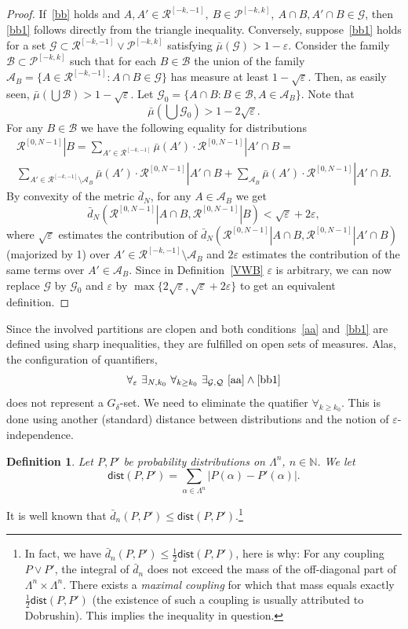 \documentclass{amsart}
\newtheorem{defn}[thm]{Definition}
\theoremstyle{remark}
\def \N {\mathbb N}
\def \R {\mathcal R}
\def \A {\mathcal A}
\def \B {\mathcal B}
\def \G {\mathcal G}
\def \P {\mathcal P}
\def \eps {\varepsilon}
\def \dist{\mathsf{dist}}
\begin{document}
\begin{proof}
If~\eqref{bb} holds and $A,A'\in\R^{[-k,-1]},\ B\in\P^{[-k,k]},\ A\cap B,A'\cap B\in\G$, then \eqref{bb1} follows directly from the triangle inequality. Conversely, suppose~\eqref{bb1} holds for a set
$\G\subset\R^{[-k,-1]}\vee\P^{[-k,k]}$ satisfying $\bar\mu(\G)>1-\eps$. Consider the family $\B\subset\P^{[-k,k]}$ such that for each $B\in\B$ the union of the family $\A_B=\{A\in\R^{[-k,-1]}:A\cap B\in\G\}$ has measure at least $1-\sqrt\eps$. Then, as easily seen, $\bar\mu(\bigcup\B)>1-\sqrt\eps$. Let $\G_0 = \{A\cap B:B\in\B,A\in\A_B\}$.
Note that 
\begin{equation}\label{aax}\tag{7a}
\bar\mu(\bigcup\G_0)>1-2\sqrt\eps.
\end{equation}For any $B\in\B$ we have the following  equality for distributions 
\begin{multline*}
\R^{[0,N-1]}|B = \sum_{A'\in\R^{[-k,-1]}}\bar\mu(A')\cdot\R^{[0,N-1]}|A'\cap B=\\
\sum_{A'\in\R^{[-k,-1]}\setminus\A_B}\bar\mu(A')\cdot\R^{[0,N-1]}|A'\cap B +
\sum_{\A_B}\bar\mu(A')\cdot\R^{[0,N-1]}|A'\cap B.
\end{multline*}
By convexity of the metric $\bar d_N$, for any $A\in\A_B$ we get
\begin{equation}\label{aa1}\tag{8a}
\bar d_N(\R^{[0,N-1]}|A\cap B, \R^{[0,N-1]}|B)<\sqrt\eps + 2\eps,
\end{equation}
where $\sqrt\eps$ estimates the contribution of $\bar d_N(\R^{[0,N-1]}|A\cap B, \R^{[0,N-1]}|A'\cap B)$ (majorized by 1) over $A'\in\R^{[-k,-1]}\setminus\A_B$ and $2\eps$ estimates the contribution of the same terms over $A'\in\A_B$. Since in Definition~\ref{VWB} $\eps$ is arbitrary, we can now replace $\G$ by $\G_0$ and $\eps$ by $\max\{2\sqrt\eps,\sqrt\eps+2\eps\}$ to get an equivalent definition. 
\end{proof}

Since the involved partitions are clopen and both conditions~\eqref{aa} and~\eqref{bb1} are defined using sharp inequalities, they are fulfilled on open sets of measures. Alas, the configuration of quantifiers,
$$
\forall_{\eps}\ \exists_{N,k_0}\ \forall_{k\ge k_0}\ \exists_{\mathcal G,\mathcal Q} \ \eqref{aa}\wedge\eqref{bb1}
$$
does not represent a $G_\delta$-set. We need to eliminate the quatifier $\forall_{k\ge k_0}$. This is done using another (standard) distance between distributions and the notion of $\eps$-independence. 

\begin{defn}\label{dist}
Let $P,P'$ be probability distributions on $\Lambda^n$, $n\in\N$. We let
$$
\dist(P,P')=\sum_{\alpha\in\Lambda^n}|P(\alpha)-P'(\alpha)|.
$$
\end{defn}
It is well known that $\bar d_n(P,P')\le\dist(P,P')$.\footnote{In fact, we have $\bar d_n(P,P')\le\frac12\dist(P,P')$, here is why: For any coupling $P\vee P'$, the integral of $\bar d_n$ does not exceed the mass of the off-diagonal part of $\Lambda^n\times\Lambda^n$. There exists a \emph{maximal coupling} for which that mass equals exactly $\frac12\dist(P,P')$ (the existence of such a coupling is usually attributed to Dobrushin). This implies the  inequality in question.}  
\end{document}
